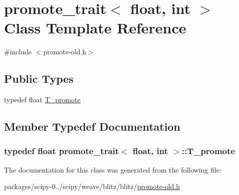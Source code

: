 \hypertarget{classpromote__trait_3_01float_00_01int_01_4}{}\section{promote\+\_\+trait$<$ float, int $>$ Class Template Reference}
\label{classpromote__trait_3_01float_00_01int_01_4}


{\ttfamily \#include $<$promote-\/old.\+h$>$}

\subsection*{Public Types}
\begin{DoxyCompactItemize}
\item 
typedef float \hyperlink{classpromote__trait_3_01float_00_01int_01_4_a97b4dcdff503298e358d8fc4d1c80faa}{T\+\_\+promote}
\end{DoxyCompactItemize}


\subsection{Member Typedef Documentation}
\hypertarget{classpromote__trait_3_01float_00_01int_01_4_a97b4dcdff503298e358d8fc4d1c80faa}{}
\subsubsection[{T\+\_\+promote}]{\setlength{\rightskip}{0pt plus 5cm}typedef float {\bf promote\+\_\+trait}$<$ float, int $>$\+::{\bf T\+\_\+promote}}\label{classpromote__trait_3_01float_00_01int_01_4_a97b4dcdff503298e358d8fc4d1c80faa}


The documentation for this class was generated from the following file\+:\begin{DoxyCompactItemize}
\item 
packages/scipy-\/0../scipy/weave/blitz/blitz/\hyperlink{promote-old_8h}{promote-\/old.\+h}\end{DoxyCompactItemize}
